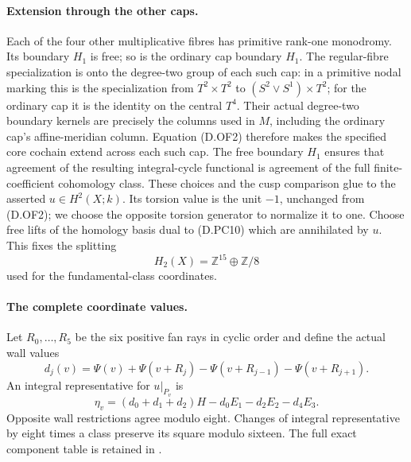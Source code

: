 \paragraph{Extension through the other caps.}
Each of the four other multiplicative fibres has primitive
rank-one monodromy. Its boundary \(H_1\) is free; so is the
ordinary cap boundary \(H_1\).
The regular-fibre specialization is onto the degree-two group
of each such cap: in a primitive nodal marking this is the
specialization from \(T^2\times T^2\) to
\((S^2\vee S^1)\times T^2\); for the ordinary cap it is the
identity on the central \(T^4\).
Their actual degree-two boundary kernels
are precisely the columns used in \(M\), including the
ordinary cap's affine-meridian column.
Equation (D.OF2) therefore makes the specified core cochain
extend across each such cap. The free boundary \(H_1\)
ensures that agreement of the resulting integral-cycle
functional is agreement of the full finite-coefficient
cohomology class. These choices and the cusp comparison
glue to the asserted \(u\in H^2(X;k)\).
Its torsion value is the unit \(-1\), unchanged from (D.OF2);
we choose the opposite torsion generator to normalize it to one.
Choose free lifts of the homology basis dual to (D.PC10)
which are annihilated by \(u\). This fixes the splitting
\[
                         H_2(X)=\mathbb Z^{15}\oplus\mathbb Z/8
                                                               \tag{D.OF15}
\]
used for the fundamental-class coordinates.

\paragraph{The complete coordinate values.}
Let \(R_0,\ldots,R_5\) be the six positive fan rays in cyclic
order and define the actual wall values
\[
 d_j(v)=\Psi(v)+\Psi(v+R_j)
                    -\Psi(v+R_{j-1})-\Psi(v+R_{j+1}).
\]
An integral representative for \(u|_{P_v}\) is
\[
 \eta_v=(d_0+d_1+d_2)H-d_0E_1-d_2E_2-d_4E_3.             \tag{D.OF16}
\]
Opposite wall restrictions agree modulo eight. Changes of integral
representative by eight times a class preserve its square modulo
sixteen. The full exact component table is retained in
.

